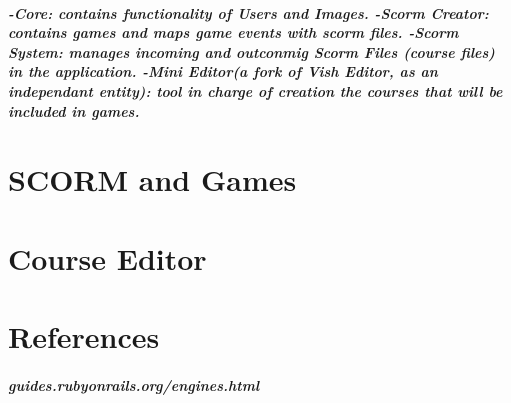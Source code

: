\documentclass{book}
\begin{document}
\paragraph{
	-Core: contains functionality of Users and Images.
	-Scorm Creator: contains games and maps game events with scorm files.
	-Scorm System: manages incoming and outconmig Scorm Files (course files) in the application.
	-Mini Editor(a fork of Vish Editor, as an independant entity): tool in charge of creation the courses that will be included in games. 
}



\chapter{SCORM and Games}


\chapter{Course Editor}

\chapter{References}
\paragraph{guides.rubyonrails.org/engines.html}
\end{document}
